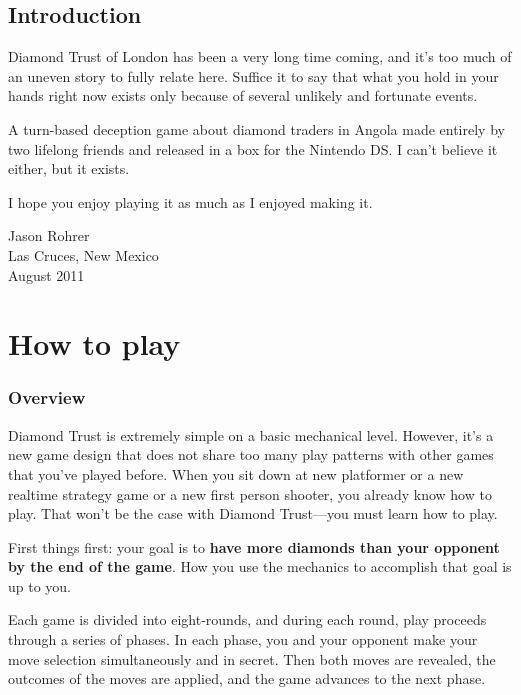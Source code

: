 \documentclass[8pt]{extbook}
\begin{document}
\frontmatter

\tableofcontents


\chapter{Introduction}

Diamond Trust of London has been a very long time coming, and it's too much of an uneven story to fully relate here.  Suffice it to say that what you hold in your hands right now exists only because of several unlikely and fortunate events.  

A turn-based deception game about diamond traders in Angola made entirely by two lifelong friends and released in a box for the Nintendo DS.  I can't believe it either, but it exists.  

I hope you enjoy playing it as much as I enjoyed making it.

\begin{flushright}
\begin{minipage}{1.5in}
Jason Rohrer\\
Las Cruces, New Mexico\\
August 2011
\end{minipage}
\end{flushright}

\mainmatter

\part{How to play}
\addtocounter{chapter}{1}
\setcounter{section}{0}

\section{Overview}
Diamond Trust is extremely simple on a basic mechanical level.  However, it's a new game design that does not share too many play patterns with other games that you've played before.  When you sit down at new platformer or a new realtime strategy game or a new first person shooter, you already know how to play.  That won't be the case with Diamond Trust---you must learn how to play.

First things first:  your goal is to {\bf have more diamonds than your opponent by the end of the game}.  How you use the mechanics to accomplish that goal is up to you.

Each game is divided into eight-rounds, and during each round, play proceeds through a series of phases.  In each phase, you and your opponent make your move selection simultaneously and in secret.  Then both moves are revealed, the outcomes of the moves are applied, and the game advances to the next phase.
\end{document}
